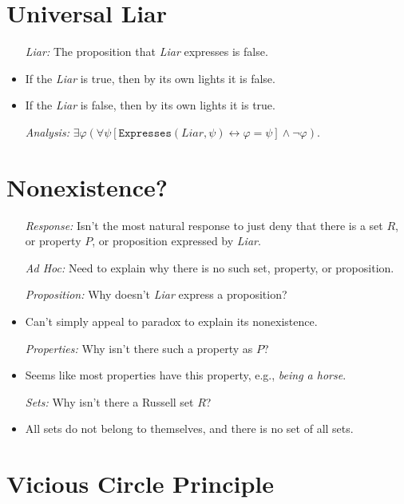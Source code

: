 \documentclass[a4paper, 11pt]{article} %
\begin{document}
\section*{Universal Liar}

  \begin{itemize}
    \item[\it Liar:] The proposition that \textit{Liar} expresses is false.
      \item If the \textit{Liar} is true, then by its own lights it is false.
      \item If the \textit{Liar} is false, then by its own lights it is true.
    \item[\it Analysis:] $\exists \varphi(\forall \psi[\texttt{Expresses}(\textit{Liar},\psi) \leftrightarrow \varphi = \psi] \wedge \neg \varphi)$.
  \end{itemize}






\section*{Nonexistence?}

  \begin{itemize}
    \item[\it Response:] Isn't the most natural response to just deny that there is a set $R$, or property $P$, or proposition expressed by \textit{Liar}.
    \item[\it Ad Hoc:] Need to explain why there is no such set, property, or proposition.
    \item[\it Proposition:] Why doesn't \textit{Liar} express a proposition?
      \item Can't simply appeal to paradox to explain its nonexistence.
    \item[\it Properties:] Why isn't there such a property as $P$?
      \item Seems like most properties have this property, e.g., \textit{being a horse}.
    \item[\it Sets:] Why isn't there a Russell set $R$?
      \item All sets do not belong to themselves, and there is no set of all sets.
  \end{itemize}




\section*{Vicious Circle Principle}
\end{document}
